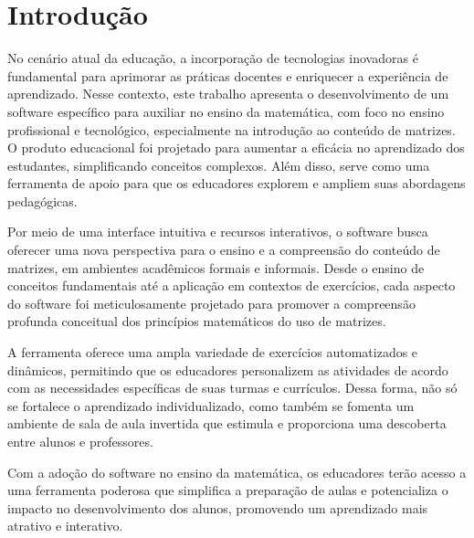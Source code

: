 \chapter{Introdução}
\label{introducao}


No cenário atual da educação, a incorporação de tecnologias inovadoras é fundamental para aprimorar as práticas docentes e enriquecer a experiência de aprendizado. Nesse contexto, este trabalho apresenta o desenvolvimento de um software específico para auxiliar no ensino da matemática, com foco no ensino profissional e tecnológico, especialmente na introdução ao conteúdo de matrizes. O produto educacional foi projetado para aumentar a eficácia no aprendizado dos estudantes, simplificando conceitos complexos. Além disso, serve como uma ferramenta de apoio para que os educadores explorem e ampliem suas abordagens pedagógicas.

Por meio de uma interface intuitiva e recursos interativos, o software busca oferecer uma nova perspectiva para o ensino e a compreensão do conteúdo de matrizes, em ambientes acadêmicos formais e informais. Desde o ensino de conceitos fundamentais até a aplicação em contextos de exercícios, cada aspecto do software foi meticulosamente projetado para promover a compreensão profunda conceitual dos princípios matemáticos do uso de matrizes.

A ferramenta oferece uma ampla variedade de exercícios automatizados e dinâmicos, permitindo que os educadores personalizem as atividades de acordo com as necessidades específicas de suas turmas e currículos. Dessa forma, não só se fortalece o aprendizado individualizado, como também se fomenta um ambiente de sala de aula invertida que estimula e proporciona uma descoberta entre alunos e professores.

Com a adoção do software no ensino da matemática, os educadores terão acesso a uma ferramenta poderosa que simplifica a preparação de aulas e potencializa o impacto no desenvolvimento dos alunos, promovendo um aprendizado mais atrativo e interativo.











